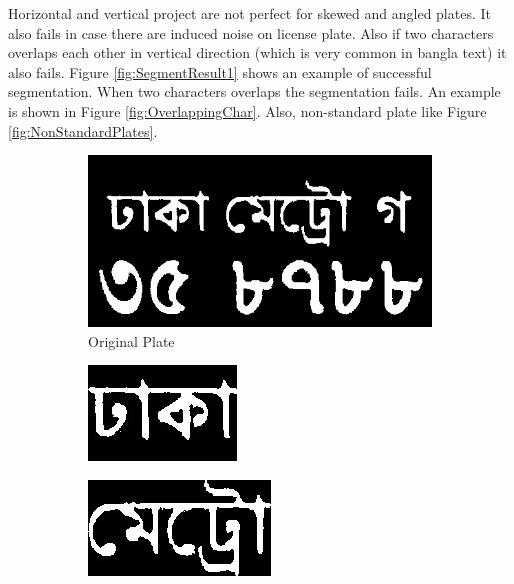 Horizontal and vertical project are not perfect for skewed and angled plates. It also fails in case there are induced noise on license plate. Also if two characters overlaps each other in vertical direction (which is very common in bangla text) it also fails. Figure \ref{fig:SegmentResult1} shows an example of successful segmentation. When two characters overlaps the segmentation fails. An example is shown in Figure \ref{fig:OverlappingChar}. Also, non-standard plate like Figure \ref{fig:NonStandardPlates}.


\begin{figure}
\begin{subfigure}{\textwidth}
    \centering
    \includegraphics[width=0.5\linewidth]{./img/experiment/stage.16/01-00-good}
    \caption{Original Plate}
\end{subfigure}
\begin{subfigure}{0.15\textwidth}
    \centering
    \includegraphics[width=0.9\linewidth]{./img/experiment/stage.17/00-01-00-good}
\end{subfigure}
\begin{subfigure}{0.15\textwidth}
    \centering
    \includegraphics[width=0.9\linewidth]{./img/experiment/stage.17/01-01-00-good}

\end{subfigure}
\end{figure}
